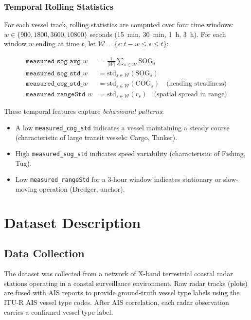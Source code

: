 \documentclass[12pt, a4paper]{article}
\begin{document}
\subsubsection{Temporal Rolling Statistics}

For each vessel track, rolling statistics are computed over four time windows:
$w \in \{900, 1800, 3600, 10800\}$ seconds (15~min, 30~min, 1~h, 3~h).
For each window $w$ ending at time $t$, let $\mathcal{W} = \{s : t-w \le s \le t\}$:

\begin{align}
    \texttt{measured\_sog\_avg\_}w &= \frac{1}{|\mathcal{W}|}\sum_{s \in \mathcal{W}} \text{SOG}_s \\
    \texttt{measured\_sog\_std\_}w &= \text{std}_{s \in \mathcal{W}}(\text{SOG}_s) \\
    \texttt{measured\_cog\_std\_}w &= \text{std}_{s \in \mathcal{W}}(\text{COG}_s) \quad \text{(heading steadiness)}\\
    \texttt{measured\_rangeStd\_}w &= \text{std}_{s \in \mathcal{W}}(r_s) \quad \text{(spatial spread in range)}
\end{align}

These temporal features capture \emph{behavioural patterns}:
\begin{itemize}
    \item A low \texttt{measured\_cog\_std} indicates a vessel maintaining a
          steady course (characteristic of large transit vessels: Cargo, Tanker).
    \item High \texttt{measured\_sog\_std} indicates speed variability
          (characteristic of Fishing, Tug).
    \item Low \texttt{measured\_rangeStd} for a 3-hour window indicates
          stationary or slow-moving operation (Dredger, anchor).
\end{itemize}

\section{Dataset Description}
\label{sec:dataset}

\subsection{Data Collection}

The dataset was collected from a network of X-band terrestrial coastal radar
stations operating in a coastal surveillance environment. Raw radar tracks
(plots) are fused with AIS reports to provide ground-truth vessel type labels
using the ITU-R AIS vessel type codes. After AIS correlation, each radar
observation carries a confirmed vessel type label.
\end{document}
